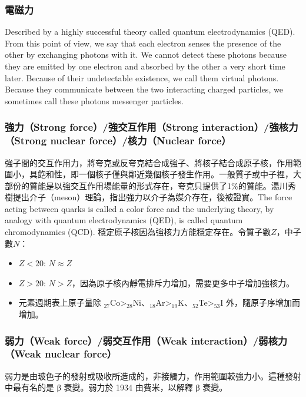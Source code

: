 \documentclass[a4paper,12pt]{article}
\begin{document}
\subsubsection{電磁力}
Described by a highly successful theory called quantum electrodynamics (QED). From this point of view, we say that each electron senses the presence of the other by exchanging photons with it. We cannot detect these photons because they are emitted by one electron and absorbed by the other a very short time later. Because of their undetectable existence, we call them virtual photons. Because they communicate between the two interacting charged particles, we sometimes call these photons messenger particles.
\subsubsection{強力（Strong force）/強交互作用（Strong interaction）/強核力（Strong nuclear force）/核力（Nuclear force）}
強子間的交互作用力，將夸克或反夸克結合成強子、將核子結合成原子核，作用範圍小，具飽和性，即一個核子僅與鄰近幾個核子發生作用。一般質子或中子裡，大部份的質能是以強交互作用場能量的形式存在，夸克只提供了1\%的質能。湯川秀樹提出介子（meson）理論，指出強力以介子為媒介存在，後被證實。The force acting between quarks is called a color force and the underlying theory, by analogy with quantum electrodynamics (QED), is called quantum chromodynamics (QCD).
\bctf{}\efct
穩定原子核因為強核力方能穩定存在。令質子數$Z$，中子數$N$：
\begin{itemize}
\item $Z<20$: $N\approx Z$
\item $Z>20$: $N>Z$，因為原子核內靜電排斥力增加，需要更多中子增加強核力。
\item 元素週期表上原子量除 $_{27}$Co>$_{28}$Ni、$_{18}$Ar>$_{19}$K、$_{52}$Te>$_{53}$I 外，隨原子序增加而增加。
\end{itemize}
\subsubsection{弱力（Weak force）/弱交互作用（Weak interaction）/弱核力（Weak nuclear force）}
弱力是由玻色子的發射或吸收所造成的，非接觸力，作用範圍較強力小。這種發射中最有名的是  β  衰變。弱力於 1934 由費米，以解釋 β 衰變。
\end{document}
